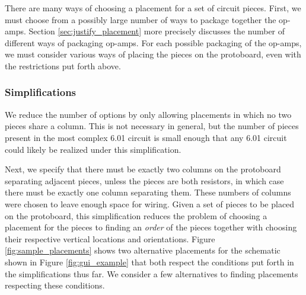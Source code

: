 There are many ways of choosing a placement for a set of circuit pieces.
First, we must choose from a possibly large number of ways
to package together the op-amps. Section \ref{sec:justify_placement} more
precisely discusses the number of different ways of packaging op-amps.
For each possible packaging of the
op-amps, we must consider various ways of placing the pieces on the protoboard,
even with the restrictions put forth above.

\subsubsection{Simplifications}

We reduce the number of options by only allowing placements in which no
two pieces share a column. This is not necessary in general, but the
number of pieces present in the most complex 6.01 circuit is small enough that
any 6.01 circuit could likely be realized under this simplification.

Next, we specify that there must be exactly two columns on the protoboard
separating adjacent pieces, unless the pieces are both resistors, in which
case there must be exactly one column separating them. These numbers of columns
were chosen to leave enough space for wiring. Given a set of pieces to be placed
on the protoboard, this simplification reduces the
problem of choosing a placement for the pieces to finding an \emph{order} of the
pieces together with choosing their respective vertical locations and
orientations. Figure \ref{fig:sample_placements} shows two alternative
placements for the schematic shown in Figure \ref{fig:gui_example} that both
respect the conditions put forth in the simplifications thus far.
We consider a few alternatives to finding placements respecting these conditions.

